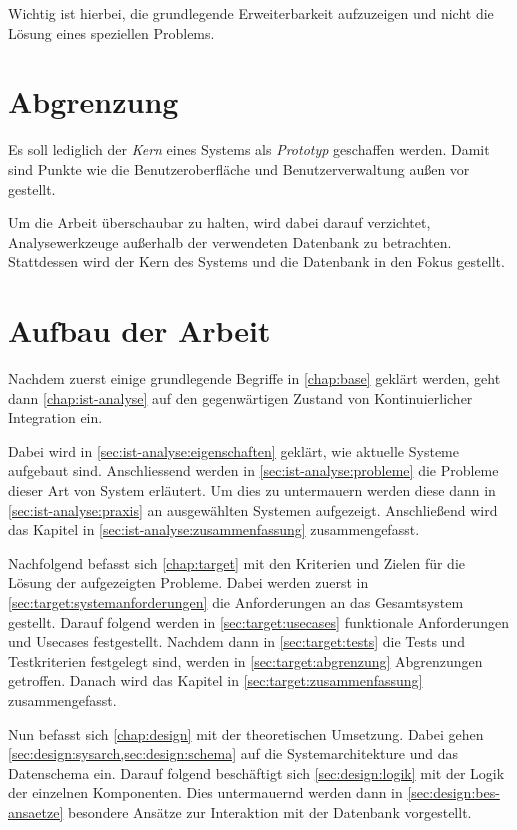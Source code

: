 Wichtig ist hierbei, die grundlegende Erweiterbarkeit aufzuzeigen
und nicht die Lösung eines speziellen Problems.

\section{Abgrenzung}
\label{sec:intro:abgrenzung}

Es soll lediglich der \emph{Kern} eines Systems als \emph{Prototyp} geschaffen werden.
Damit sind Punkte wie die Benutzeroberfläche und Benutzerverwaltung
außen vor gestellt.

Um die Arbeit überschaubar zu halten, wird dabei darauf verzichtet, Analysewerkzeuge außerhalb der verwendeten Datenbank zu betrachten.
Stattdessen wird der Kern des Systems und die Datenbank in den Fokus gestellt.


\section{Aufbau der Arbeit}
\label{sec:intro:aufbau}

Nachdem zuerst einige grundlegende Begriffe in \cref{chap:base} geklärt werden, geht dann \cref{chap:ist-analyse} auf den gegenwärtigen Zustand von Kontinuierlicher Integration ein.

Dabei wird in \cref{sec:ist-analyse:eigenschaften} geklärt, wie aktuelle Systeme aufgebaut sind. Anschliessend werden in \cref{sec:ist-analyse:probleme} die Probleme dieser Art von System erläutert. Um dies zu untermauern werden diese dann in \cref{sec:ist-analyse:praxis} an ausgewählten Systemen aufgezeigt.
Anschließend wird das Kapitel in \cref{sec:ist-analyse:zusammenfassung} zusammengefasst.

Nachfolgend befasst sich \cref{chap:target} mit den Kriterien und Zielen für die Lösung der aufgezeigten Probleme. Dabei werden zuerst in \cref{sec:target:systemanforderungen} die Anforderungen an das Gesamtsystem gestellt. Darauf folgend werden in \cref{sec:target:usecases} funktionale Anforderungen und Usecases festgestellt. Nachdem dann in \cref{sec:target:tests} die Tests und Testkriterien festgelegt sind, werden in \cref{sec:target:abgrenzung} Abgrenzungen getroffen. Danach wird das Kapitel in \cref{sec:target:zusammenfassung} zusammengefasst.

Nun befasst sich \cref{chap:design} mit der theoretischen Umsetzung.
Dabei gehen \cref{sec:design:sysarch,sec:design:schema} auf die Systemarchitekture und das Datenschema ein. Darauf folgend beschäftigt sich \cref{sec:design:logik} mit der Logik der einzelnen Komponenten. Dies untermauernd werden dann in \cref{sec:design:bes-ansaetze} besondere Ansätze zur Interaktion mit der Datenbank vorgestellt.

